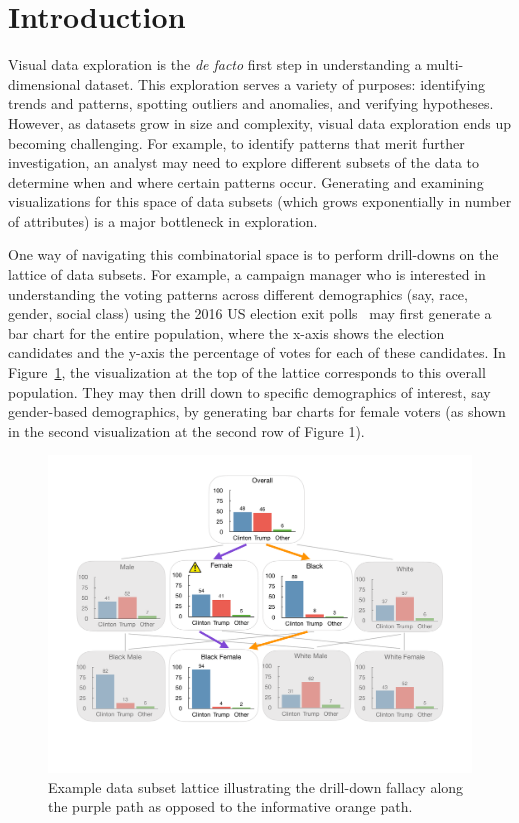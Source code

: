 \section{Introduction}
\par Visual data exploration is the \emph{de facto} first step in understanding a multi-dimensional dataset. This exploration serves a variety of purposes: identifying trends and patterns, spotting outliers and anomalies, and verifying hypotheses. However, as datasets grow in size and complexity, visual data exploration ends up becoming challenging. For example, to identify patterns that merit further investigation, an analyst may need to explore different subsets of the data to determine when and where certain patterns occur. Generating and examining visualizations for this space of data subsets (which grows exponentially in number of attributes) is a major bottleneck in exploration.
\par One way of navigating this combinatorial space is to perform drill-downs on the lattice of data subsets. For example, a campaign manager who is interested in understanding the voting patterns across different demographics (say, race, gender, social class) using the 2016 US election exit polls~\cite{exitpolls} may first generate a bar chart for the entire population, where the x-axis shows the election candidates and the y-axis the percentage of votes for each of these candidates. In Figure~\ref{fig:elections_example}, the visualization at the top of the lattice corresponds to this overall population. They may then drill down to specific demographics of interest, say gender-based demographics, by generating bar charts for female voters (as shown in the second visualization at the second row of Figure 1).
\begin{figure}[ht!]
\includegraphics[width=\linewidth]{figures/elections_example_lattice_teaser.pdf}
\caption{Example data subset lattice illustrating the drill-down fallacy along the purple path as opposed to the informative orange path.}
\label{fig:elections_example}
\end{figure}
